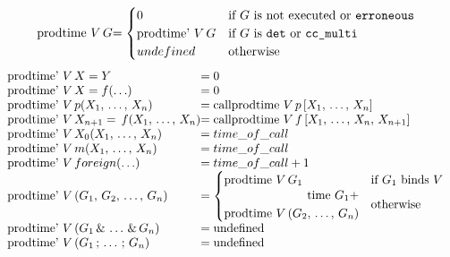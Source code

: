 \begin{algorithm}
\[
\begin{array}{l @{}l @{}l}
\prodtime V\,& G                            &=
    \begin{cases}
        0                & \text{if } G \text{ is not executed or
                            \derroneous} \\
        \prodtimep V\,G  & \text{if } G \text{ is \ddet or \dccmulti} \\
        undefined        & \text{otherwise} \\
    \end{cases} \\
\end{array}
\]
\[
\begin{array}{l @{}l @{}l}
\prodtimep V\,& X = Y                        &= 0 \\
\prodtimep V\,& X = f(\ldots)                &= 0 \\
\prodtimep V\,& p(X_1,\,\ldots,\,X_n)        &=
    \callprodtime V\,p\,[X_1,\,\ldots,\,X_n] \\
\prodtimep V\,& X_{n+1} = \,f(X_1,\,\ldots,\,X_n)  &=
    \callprodtime V\,f\,[X_1,\,\ldots,\,X_n,\,X_{n+1}] \\
\prodtimep V\,& X_0(X_1,\,\ldots,\,X_n)      &= time\_of\_call \\
\prodtimep V\,& m(X_1,\,\ldots,\,X_n)        &= time\_of\_call \\
\prodtimep V\,& foreign(\ldots)              &= time\_of\_call + 1 \\
\prodtimep V\,& (G_1,\,G_2,\,\ldots,\,G_n)   &=
   \begin{cases}
       \prodtime V\,G_1
            & \text{if } G_1 \text{ binds } V \\
       \begin{split}
           \timef G_1 + \\ \prodtime V\,(G_2,\,\ldots,\,G_n)
       \end{split}
            & \text{otherwise}
   \end{cases} \\
\prodtimep V\,& (G_1\,\&\,\ldots\,\&\,G_n)   &= \undef \\
\prodtimep V\,& (G_1\,;\,\ldots\,;\,G_n)     &= \undef \\

\end{array}\]
\end{algorithm}
